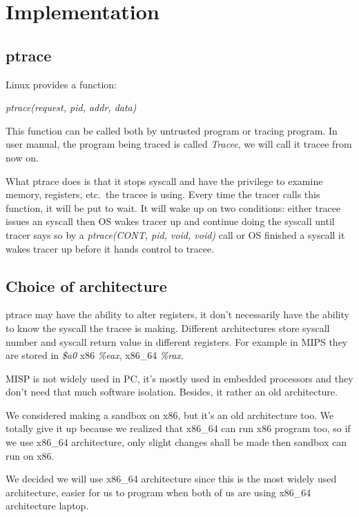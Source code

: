 \documentclass[conference,compsoc]{IEEEtran}
\begin{document}
\section{Implementation}


	\subsection{ptrace}

		\par
			Linux provides a function:\\
				\begin{center}
				\emph{ptrace(request, pid, addr, data)}
				\end{center}
			This function can be called both by untrusted program or tracing program. 
			In user manual, the program being traced is called \emph{Tracee}, we will call it tracee from now on.
		\par 
			What ptrace does is that it stops syscall and have the privilege to examine memory, registers, etc.\ the tracee is using. 
			Every time the tracer calls this function, it will be put to wait. 
			It will wake up on two conditions: either tracee issues an syscall then OS wakes tracer up and continue doing the syscall until tracer says so by a \emph{ptrace(CONT, pid, void, void)} call or OS finished a syscall it wakes tracer up before it hands control to tracee.

	\subsection{Choice of architecture}

		\par
			ptrace may have the ability to alter registers, it don't necessarily have the ability to know the syscall the tracee is making. 
			Different architectures store syscall number and syscall return value in different registers. 
			For example in MIPS they are stored in \emph{\$a0} x86 \emph{\%eax}, x86\_64 \emph{\%rax}.
		\par
			MISP is not widely used in PC, it's mostly used in embedded processors and they don't need that much software isolation. 
			Besides, it rather an old architecture.
		\par 
			We considered making a sandbox on x86, but it's an old architecture too. 
			We totally give it up because we realized that x86\_64 can run x86 program too, so if we use x86\_64 architecture, only slight changes shall be made then sandbox can run on x86.
		\par 
			We decided we will use x86\_64 architecture since this is the most widely used architecture, easier for us to program when both of us are using x86\_64 architecture laptop.
\end{document}
